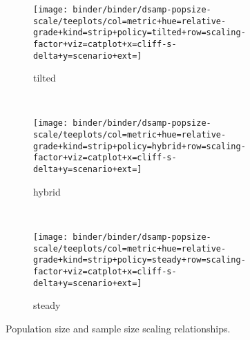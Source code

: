 \newcommand{\rulesep}{\unskip\ \vrule\ }

\begin{figure*}
  \centering
  \begin{subfigure}[b]{0.33\textwidth}
    \centering
    \texttt{[image: binder/binder/dsamp-popsize-scale/teeplots/col=metric+hue=relative-grade+kind=strip+policy=tilted+row=scaling-factor+viz=catplot+x=cliff-s-delta+y=scenario+ext=]}
    \caption{tilted}
  \end{subfigure}%
  \rulesep %
  \begin{subfigure}[b]{0.26\textwidth}
    \centering
    \texttt{[image: binder/binder/dsamp-popsize-scale/teeplots/col=metric+hue=relative-grade+kind=strip+policy=hybrid+row=scaling-factor+viz=catplot+x=cliff-s-delta+y=scenario+ext=]}
    \caption{hybrid}
  \end{subfigure}%
  \rulesep %
  \begin{subfigure}[b]{0.39\textwidth}
    \centering
    \texttt{[image: binder/binder/dsamp-popsize-scale/teeplots/col=metric+hue=relative-grade+kind=strip+policy=steady+row=scaling-factor+viz=catplot+x=cliff-s-delta+y=scenario+ext=]}
    \caption{steady}
  \end{subfigure}
  \caption{Population size and sample size scaling relationships.}
  \label{fig:scaling-summary}
\end{figure*}